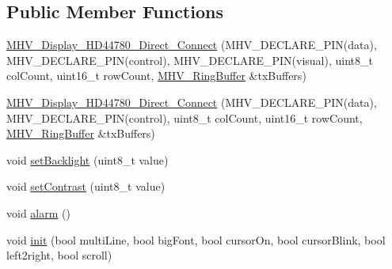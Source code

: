 \subsection*{\-Public \-Member \-Functions}
\begin{DoxyCompactItemize}
\item 
\hyperlink{class_m_h_v___display___h_d44780___direct___connect_aecd4894b4044fde51b75ef609904036f}{\-M\-H\-V\-\_\-\-Display\-\_\-\-H\-D44780\-\_\-\-Direct\-\_\-\-Connect} (\-M\-H\-V\-\_\-\-D\-E\-C\-L\-A\-R\-E\-\_\-\-P\-I\-N(data), \-M\-H\-V\-\_\-\-D\-E\-C\-L\-A\-R\-E\-\_\-\-P\-I\-N(control), \-M\-H\-V\-\_\-\-D\-E\-C\-L\-A\-R\-E\-\_\-\-P\-I\-N(visual), uint8\-\_\-t col\-Count, uint16\-\_\-t row\-Count, \hyperlink{class_m_h_v___ring_buffer}{\-M\-H\-V\-\_\-\-Ring\-Buffer} \&tx\-Buffers)
\item 
\hyperlink{class_m_h_v___display___h_d44780___direct___connect_aea26b842b0f5ed5e8568620354c4021e}{\-M\-H\-V\-\_\-\-Display\-\_\-\-H\-D44780\-\_\-\-Direct\-\_\-\-Connect} (\-M\-H\-V\-\_\-\-D\-E\-C\-L\-A\-R\-E\-\_\-\-P\-I\-N(data), \-M\-H\-V\-\_\-\-D\-E\-C\-L\-A\-R\-E\-\_\-\-P\-I\-N(control), uint8\-\_\-t col\-Count, uint16\-\_\-t row\-Count, \hyperlink{class_m_h_v___ring_buffer}{\-M\-H\-V\-\_\-\-Ring\-Buffer} \&tx\-Buffers)
\item 
void \hyperlink{class_m_h_v___display___h_d44780___direct___connect_a11b8f4c551c0c622874b4242154d9d67}{set\-Backlight} (uint8\-\_\-t value)
\item 
void \hyperlink{class_m_h_v___display___h_d44780___direct___connect_a5d890e072d56c818442b209b9d4851d8}{set\-Contrast} (uint8\-\_\-t value)
\item 
void \hyperlink{class_m_h_v___display___h_d44780___direct___connect_afde566730348a32f1699e92d2e887240}{alarm} ()
\item 
void \hyperlink{class_m_h_v___display___h_d44780___direct___connect_a82d09a64c377a8b25751a9b21d9cee93}{init} (bool multi\-Line, bool big\-Font, bool cursor\-On, bool cursor\-Blink, bool left2right, bool scroll)
\end{DoxyCompactItemize}
